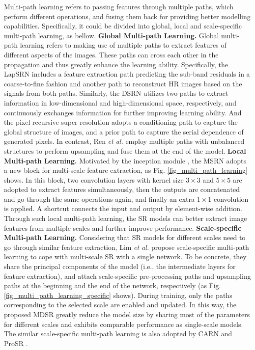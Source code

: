 {\label{sec_multi_path_learning}
Multi-path learning refers to passing features through multiple paths, which perform different operations, and fusing them back for providing better modelling capabilities.
Specifically, it could be divided into global, local and scale-specific multi-path learning, as bellow.
\textbf{Global Multi-path Learning.}
Global multi-path learning refers to making use of multiple paths to extract features of different aspects of the images.
These paths can cross each other in the propagation and thus greatly enhance the learning ability.
Specifically, the LapSRN  includes a feature extraction path predicting the sub-band residuals in a coarse-to-fine fashion and another path to reconstruct HR images based on the signals from both paths.
Similarly, the DSRN  utilizes two paths to extract information in low-dimensional and high-dimensional space, respectively, and continuously exchanges information for further improving learning ability.
And the pixel recursive super-resolution  adopts a conditioning path to capture the global structure of images, and a prior path to capture the serial dependence of generated pixels.
In contrast, Ren \textit{et al.}  employ multiple paths with unbalanced structures to perform upsampling and fuse them at the end of the model.
\textbf{Local Multi-path Learning.}
Motivated by the inception module , the MSRN  adopts a new block for multi-scale feature extraction, as Fig. \ref{fig_multi_path_learning} shows.
In this block, two convolution layers with kernel size $3\times 3$ and $5\times 5$ are adopted to extract features simultaneously, then the outputs are concatenated and go through the same operations again, and finally an extra $1\times 1$ convolution is applied.
A shortcut connects the input and output by element-wise addition.
Through such local multi-path learning, the SR models can better extract image features from multiple scales and further improve performance.
\textbf{Scale-specific Multi-path Learning.}
Considering that SR models for different scales need to go through similar feature extraction, Lim \textit{et al.}  propose scale-specific multi-path learning to cope with multi-scale SR with a single network.
To be concrete, they share the principal components of the model (i.e., the intermediate layers for feature extraction), and attach scale-specific pre-processing paths and upsampling paths at the beginning and the end of the network, respectively (as Fig. \ref{fig_multi_path_learning_specific} shows).
During training, only the paths corresponding to the selected scale are enabled and updated.
In this way, the proposed MDSR  greatly reduce the model size by sharing most of the parameters for different scales and exhibits comparable performance as single-scale models.
The similar scale-specific multi-path learning is also adopted by CARN  and ProSR .

}
